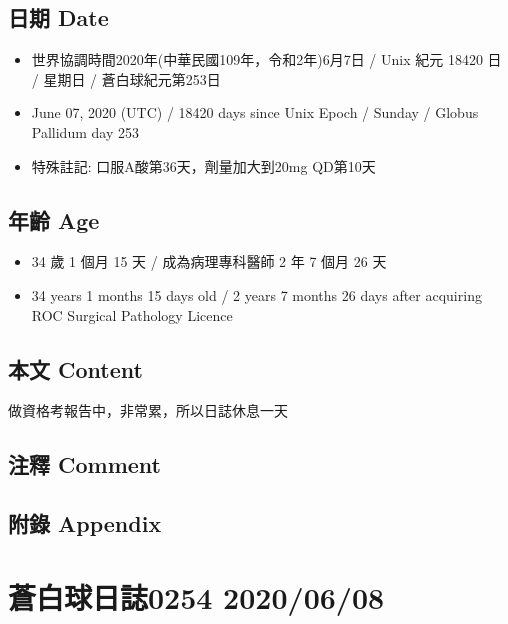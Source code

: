 \documentclass[a5paper, 11pt
]{book}
\providecommand{\tightlist}{%
  \setlength{\itemsep}{0pt}\setlength{\parskip}{0pt}}
\begin{document}
\hypertarget{ux65e5ux671f-date-6}{%
\subsection{日期 Date}\label{ux65e5ux671f-date-6}}

\begin{itemize}
\tightlist
\item
  世界協調時間2020年(中華民國109年，令和2年)6月7日 / Unix 紀元 18420 日
  / 星期日 / 蒼白球紀元第253日
\item
  June 07, 2020 (UTC) / 18420 days since Unix Epoch / Sunday / Globus
  Pallidum day 253
\item
  特殊註記: 口服A酸第36天，劑量加大到20mg QD第10天
\end{itemize}

\hypertarget{ux5e74ux9f61-age-6}{%
\subsection{年齡 Age}\label{ux5e74ux9f61-age-6}}

\begin{itemize}
\tightlist
\item
  34 歲 1 個月 15 天 / 成為病理專科醫師 2 年 7 個月 26 天
\item
  34 years 1 months 15 days old / 2 years 7 months 26 days after
  acquiring ROC Surgical Pathology Licence
\end{itemize}

\hypertarget{ux672cux6587-content-6}{%
\subsection{本文 Content}\label{ux672cux6587-content-6}}

做資格考報告中，非常累，所以日誌休息一天

\hypertarget{ux6ce8ux91cb-comment-6}{%
\subsection{注釋 Comment}\label{ux6ce8ux91cb-comment-6}}

\hypertarget{ux9644ux9304-appendix-6}{%
\subsection{附錄 Appendix}\label{ux9644ux9304-appendix-6}}

\hypertarget{ux84bcux767dux7403ux65e5ux8a8c0254-20200608}{%
\section{蒼白球日誌0254
2020/06/08}\label{ux84bcux767dux7403ux65e5ux8a8c0254-20200608}}
\end{document}
